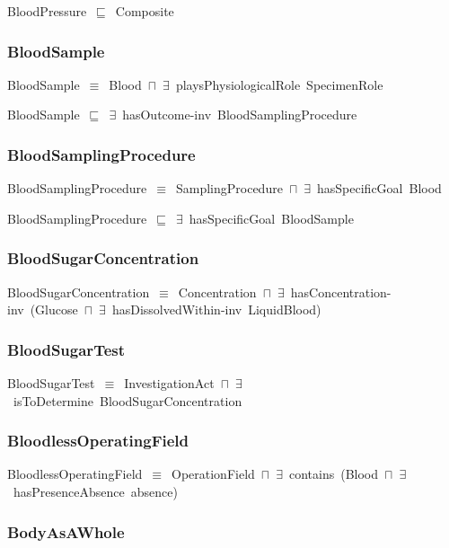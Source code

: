 \documentclass{article}
\begin{document}
BloodPressure~\ensuremath{\sqsubseteq}~Composite~

\subsubsection*{BloodSample}

BloodSample~\ensuremath{\equiv}~Blood~\ensuremath{\sqcap}~\ensuremath{\exists}~playsPhysiologicalRole~SpecimenRole

BloodSample~\ensuremath{\sqsubseteq}~\ensuremath{\exists}~hasOutcome-inv~BloodSamplingProcedure~

\subsubsection*{BloodSamplingProcedure}

BloodSamplingProcedure~\ensuremath{\equiv}~SamplingProcedure~\ensuremath{\sqcap}~\ensuremath{\exists}~hasSpecificGoal~Blood

BloodSamplingProcedure~\ensuremath{\sqsubseteq}~\ensuremath{\exists}~hasSpecificGoal~BloodSample~

\subsubsection*{BloodSugarConcentration}

BloodSugarConcentration~\ensuremath{\equiv}~Concentration~\ensuremath{\sqcap}~\ensuremath{\exists}~hasConcentration-inv~(Glucose~\ensuremath{\sqcap}~\ensuremath{\exists}~hasDissolvedWithin-inv~LiquidBlood)

\subsubsection*{BloodSugarTest}

BloodSugarTest~\ensuremath{\equiv}~InvestigationAct~\ensuremath{\sqcap}~\ensuremath{\exists}~isToDetermine~BloodSugarConcentration

\subsubsection*{BloodlessOperatingField}

BloodlessOperatingField~\ensuremath{\equiv}~OperationField~\ensuremath{\sqcap}~\ensuremath{\exists}~contains~(Blood~\ensuremath{\sqcap}~\ensuremath{\exists}~hasPresenceAbsence~absence)

\subsubsection*{BodyAsAWhole}
\end{document}
